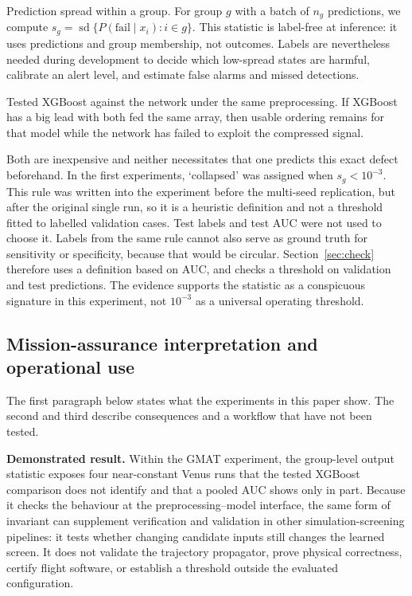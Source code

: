 \documentclass[preprint,12pt,authoryear]{elsarticle}
\begin{document}
Prediction spread within a group. For group $g$ with a batch of $n_g$ predictions, we compute $s_g=\operatorname{sd}\{P(\mathrm{fail}\mid x_i):i\in g\}$. This statistic is label-free at inference: it uses predictions and group membership, not outcomes. Labels are nevertheless needed during development to decide which low-spread states are harmful, calibrate an alert level, and estimate false alarms and missed detections.

Tested XGBoost against the network under the same preprocessing. If XGBoost has a big lead with both fed the same array, then usable ordering remains for that model while the network has failed to exploit the compressed signal.

Both are inexpensive and neither necessitates that one predicts this exact defect beforehand. In the first experiments, `collapsed' was assigned when $s_g<10^{-3}$. This rule was written into the experiment before the multi-seed replication, but after the original single run, so it is a heuristic definition and not a threshold fitted to labelled validation cases. Test labels and test AUC were not used to choose it. Labels from the same rule cannot also serve as ground truth for sensitivity or specificity, because that would be circular. Section~\ref{sec:check} therefore uses a definition based on AUC, and checks a threshold on validation and test predictions. The evidence supports the statistic as a conspicuous signature in this experiment, not $10^{-3}$ as a universal operating threshold.

\subsection{Mission-assurance interpretation and operational use}

The first paragraph below states what the experiments in this paper show. The second and third describe consequences and a workflow that have not been tested.

\textbf{Demonstrated result.} Within the GMAT experiment, the group-level output statistic exposes four near-constant Venus runs that the tested XGBoost comparison does not identify and that a pooled AUC shows only in part. Because it checks the behaviour at the preprocessing--model interface, the same form of invariant can supplement verification and validation in other simulation-screening pipelines: it tests whether changing candidate inputs still changes the learned screen. It does not validate the trajectory propagator, prove physical correctness, certify flight software, or establish a threshold outside the evaluated configuration.
\end{document}
